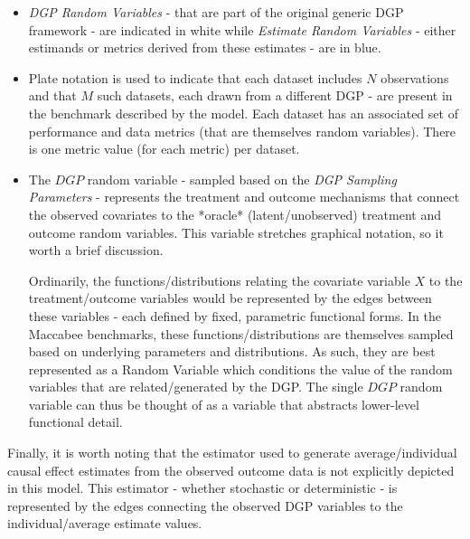 \documentclass[../main.tex]{subfiles}
\begin{document}
\begin{itemize}
    \item \textit{DGP Random Variables} - that are part of the original generic DGP framework - are indicated in white while \textit{Estimate Random Variables} - either estimands or metrics derived from these estimates - are in blue.

    \item Plate notation is used to indicate that each dataset includes $N$ observations and that $M$ such datasets, each drawn from a different DGP - are present in the benchmark described by the model. Each dataset has an associated set of performance and data metrics (that are themselves random variables). There is one metric value (for each metric) per dataset.

    \item The $DGP$ random variable - sampled based on the \textit{DGP Sampling Parameters} - represents the treatment and outcome mechanisms that connect the observed covariates to the *oracle* (latent/unobserved) treatment and outcome random variables. This variable stretches graphical notation, so it worth a brief discussion.

    \vspace{\baselineskip}

    Ordinarily, the functions/distributions relating the covariate variable $X$ to the treatment/outcome variables would be represented by the edges between these variables - each defined by fixed, parametric functional forms. In the Maccabee benchmarks, these functions/distributions are themselves sampled based on underlying parameters and distributions. As such, they are best represented as a Random Variable which conditions the value of the random variables that are related/generated by the DGP. The single $DGP$ random variable can thus be thought of as a variable that abstracts lower-level functional detail.

\end{itemize}

Finally, it is worth noting that the estimator used to generate average/individual causal effect estimates from the observed outcome data is not explicitly depicted in this model. This estimator - whether stochastic or deterministic - is represented by the edges connecting the observed DGP variables to the individual/average estimate values.
\end{document}
